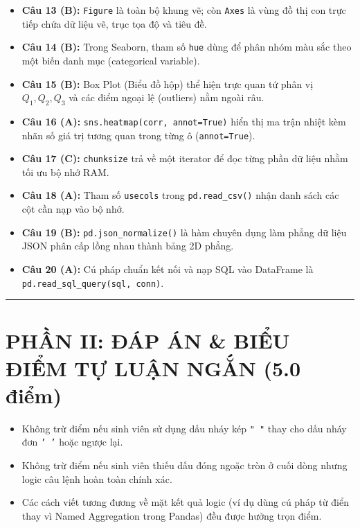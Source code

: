 \documentclass[11pt,a4paper]{article}
\begin{document}
\begin{itemize}[leftmargin=*,itemsep=1.5pt]
  \item \textbf{Câu 13 (B):} \texttt{Figure} là toàn bộ khung vẽ; còn \texttt{Axes} là vùng đồ thị con trực tiếp chứa dữ liệu vẽ, trục tọa độ và tiêu đề.
  \item \textbf{Câu 14 (B):} Trong Seaborn, tham số \texttt{hue} dùng để phân nhóm màu sắc theo một biến danh mục (categorical variable).
  \item \textbf{Câu 15 (B):} Box Plot (Biểu đồ hộp) thể hiện trực quan tứ phân vị $Q_1, Q_2, Q_3$ và các điểm ngoại lệ (outliers) nằm ngoài râu.
  \item \textbf{Câu 16 (A):} \texttt{sns.heatmap(corr, annot=True)} hiển thị ma trận nhiệt kèm nhãn số giá trị tương quan trong từng ô (\texttt{annot=True}).
  \item \textbf{Câu 17 (C):} \texttt{chunksize} trả về một iterator để đọc từng phần dữ liệu nhằm tối ưu bộ nhớ RAM.
  \item \textbf{Câu 18 (A):} Tham số \texttt{usecols} trong \texttt{pd.read\_csv()} nhận danh sách các cột cần nạp vào bộ nhớ.
  \item \textbf{Câu 19 (B):} \texttt{pd.json\_normalize()} là hàm chuyên dụng làm phẳng dữ liệu JSON phân cấp lồng nhau thành bảng 2D phẳng.
  \item \textbf{Câu 20 (A):} Cú pháp chuẩn kết nối và nạp SQL vào DataFrame là \texttt{pd.read\_sql\_query(sql, conn)}.
\end{itemize}

\vspace{3mm}
\hrule
\vspace{2mm}

\section*{PHẦN II: ĐÁP ÁN \& BIỂU ĐIỂM TỰ LUẬN NGẮN (5.0 điểm)}

\begin{tcolorbox}[colback=gray!5!white,colframe=gray!60!black,title=\textbf{Lưu ý chung dành cho Cán bộ chấm thi}]
\small
\begin{itemize}[leftmargin=*,itemsep=1pt]
  \item Không trừ điểm nếu sinh viên sử dụng dấu nháy kép \texttt{" "} thay cho dấu nháy đơn \texttt{' '} hoặc ngược lại.
  \item Không trừ điểm nếu sinh viên thiếu dấu đóng ngoặc tròn ở cuối dòng nhưng logic câu lệnh hoàn toàn chính xác.
  \item Các cách viết tương đương về mặt kết quả logic (ví dụ dùng cú pháp từ điển thay vì Named Aggregation trong Pandas) đều được hưởng trọn điểm.
\end{itemize}
\end{tcolorbox}
\end{document}
